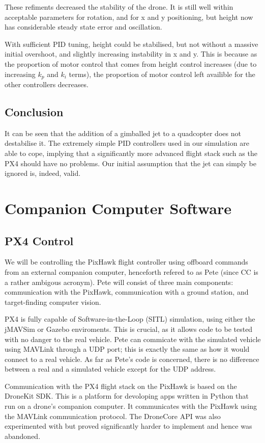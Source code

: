 \documentclass[11pt]{article}
\begin{document}
These refiments decreased the stability of the drone. It is still well within acceptable parameters for rotation, and for x and y positioning, but height now has considerable steady state error and oscillation.

With sufficient PID tuning, height could be stabilised, but not without a massive initial overshoot, and slightly increasing instability in x and y. This is because as the proportion of motor control that comes from height control increases (due to increasing $k_p$ and $k_i$ terms), the proportion of motor control left availible for the other controllers decreases.

\subsection{Conclusion}
It can be seen that the addition of a gimballed jet to a quadcopter does not destabilise it. The extremely simple PID controllers used in our simulation are able to cope, implying that a significantly more advanced flight stack such as the PX4 should have no problems. Our initial assumption that the jet can simply be ignored is, indeed, valid.

\section{Companion Computer Software}
\subsection{PX4 Control}
We will be controlling the PixHawk flight controller using offboard commands from an external companion computer, henceforth refered to as Pete (since CC is a rather ambigous acronym). Pete will consist of three main components: communication with the PixHawk, communication with a ground station, and target-finding computer vision.

PX4 is fully capable of Software-in-the-Loop (SITL) simulation, using either the jMAVSim or Gazebo enviroments. This is crucial, as it allows code to be tested with no danger to the real vehicle. Pete can commicate with the simulated vehicle using MAVLink through a UDP port; this is exactly the same as how it would connect to a real vehicle. As far as Pete's code is concerned, there is no difference between a real and a simulated vehicle except for the UDP address.

Communication with the PX4 flight stack on the PixHawk is based on the DroneKit SDK. This is a platform for devoloping apps written in Python that run on a drone's companion computer. It communicates with the PixHawk using the MAVLink communication protocol.\cite{dronekit} The DroneCore API was also experimented with but proved significantly harder to implement and hence was abandoned.
\end{document}
